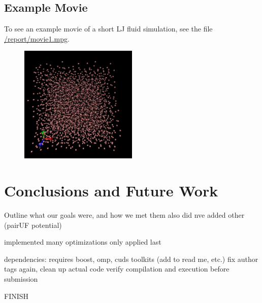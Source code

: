 \documentclass[12pt]{article}
\begin{document}
\subsection{Example Movie}
To see an example movie of a short LJ fluid simulation, see the file \url{/report/movie1.mpg}.
\begin{figure}[H]
	\begin{center}
    	\includegraphics[width=0.5\textwidth]{vmd_image.png}
	\end{center}
\end{figure}
\section{Conclusions and Future Work}

Outline what our goals were, and how we met them
also did nve
added other (pairUF potential)

implemented many optimizations only applied last 

dependencies: requires boost, omp, cuds toolkits (add to read me, etc.)
fix author tags again, clean up actual code
verify compilation and execution before submission

FINISH

\pagebreak


\end{document}
